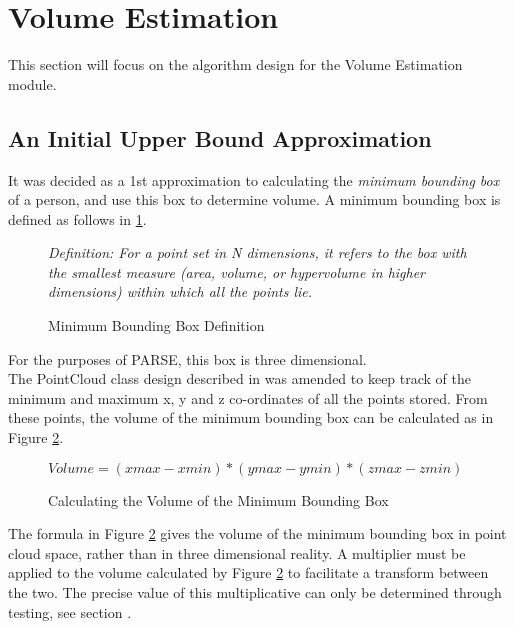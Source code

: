 \section{Volume Estimation}
\label{design:volume estimation}
This section will focus on the algorithm design for the Volume Estimation module.

\subsection{An Initial Upper Bound Approximation}
\label{design: an initial upper bound approximation}
It was decided as a 1st approximation to calculating the \textit{minimum bounding box} of a person, and use this box to determine volume.
 A minimum bounding box is defined as follows in \ref{fig:bounding_box_definition}.\\

\begin{figure}[h]
\textit{Definition: For a point set in N dimensions, it refers to the box with the smallest measure (area, volume, or hypervolume in higher dimensions) within which all the points lie.}
\caption {Minimum Bounding Box Definition \cite{Barequet2001}}
\label{fig:bounding_box_definition}
\end{figure}

For the purposes of PARSE, this box is three dimensional.\\

The PointCloud class design described in  was amended to keep track of the minimum and maximum x, y and z co-ordinates of all the points stored. 
From these points, the volume of the minimum bounding box can be calculated as in Figure \ref{fig:calculating_the_volume_of_the_minimum_bounding_box}.\\

\begin{figure}[h]
\begin{center}
$Volume = (xmax -xmin) * (ymax - ymin) * (zmax - zmin)$
\end{center}
\caption{Calculating the Volume of the Minimum Bounding Box}
\label{fig:calculating_the_volume_of_the_minimum_bounding_box}
\end{figure}

The formula in Figure \ref{fig:calculating_the_volume_of_the_minimum_bounding_box} gives the volume of the minimum bounding box in point cloud space, rather than in three dimensional reality.
A multiplier must be applied to the volume calculated by Figure \ref{fig:calculating_the_volume_of_the_minimum_bounding_box} to facilitate a transform between the two. 
The precise value of this multiplicative can only be determined through testing, see section .\\
